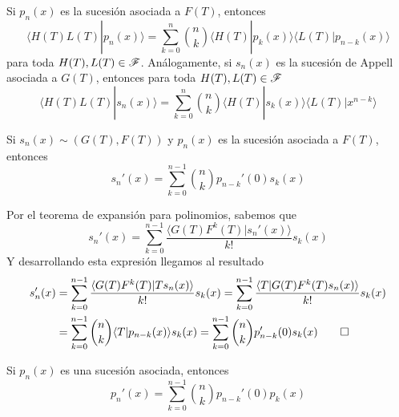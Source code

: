 \begin{corolario}\label{producto funcionales sucesion asociada y appell}
Si $p_n(x)$ es la sucesión asociada a $F(T)$, entonces
\begin{equation*}
    \langle H(T) L(T) | p_n(x) \rangle = \sum_{k=0}^n \binom{n}{k} \langle H(T) | p_k(x) \rangle \langle L(T) | p_{n-k}(x) \rangle  
\end{equation*}
para toda $H(T), L(T)  \in \mathscr{F}$. Análogamente, si $s_n(x)$ es la sucesión de Appell asociada a $G(T)$, entonces para toda $H(T), L(T) \in \mathscr{F}$
\begin{equation*}
    \langle H(T) L(T) | s_n(x) \rangle = \sum_{k=0}^n \binom{n}{k} \langle H(T) | s_k(x) \rangle \langle L(T) | x^{n-k} \rangle 
\end{equation*}
\end{corolario}
 

\begin{teorema}\label{derivada de sheffer}
    Si $s_n(x) \sim (G(T), F(T))$ y $p_n(x)$ es la sucesión asociada a $F(T)$, entonces
    \begin{equation*}
        s_n'(x) = \sum_{k=0}^{n-1} \binom{n}{k} p_{n-k}'(0) s_k(x)
    \end{equation*}
\end{teorema}

\begin{demo}
    Por el teorema de expansión para polinomios, sabemos que
    \begin{equation*}
        s_n'(x) = \sum_{k=0}^{n-1} \frac{\langle G(T)F^k(T) | s_n'(x) \rangle}{k!}s_k(x)
    \end{equation*}
    Y desarrollando esta expresión llegamos al resultado
    \begin{align*}
        s_n'(x) & = \sum_{k=0}^{n-1} \frac{\langle G(T)F^k(T) | T s_n(x) \rangle}{k!}s_k(x) = \sum_{k=0}^{n-1} \frac{\langle T | G(T)F^k(T) s_n(x) \rangle}{k!}s_k(x)\\
        & = \sum_{k=0}^{n-1} \binom{n}{k} \langle T| p_{n-k}(x) \rangle s_k(x) = \sum_{k=0}^{n-1} \binom{n}{k} p_{n-k}'(0) s_k(x) \qedhere
    \end{align*}
\end{demo}

\begin{corolario}\label{derivada sucesion asociada}
    Si $p_n(x)$ es una sucesión asociada, entonces
    \begin{equation*}
        p_n'(x) = \sum_{k=0}^{n-1} \binom{n}{k} p_{n-k}'(0) p_k(x)
    \end{equation*}
\end{corolario}


